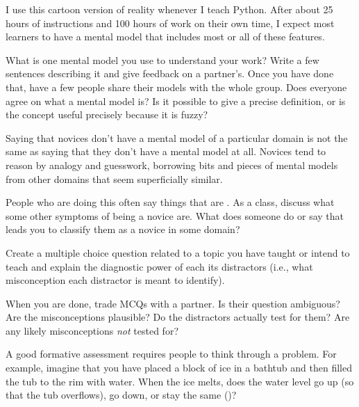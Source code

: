 I use this cartoon version of reality whenever I teach Python.
After about 25 hours of instructions and 100 hours of work on their own time,
I expect most learners to have a mental model
that includes most or all of these features.



What is one mental model you use to understand your work?
Write a few sentences describing it and give feedback on a partner's.
Once you have done that,
have a few people share their models with the whole group.
Does everyone agree on what a mental model is?
Is it possible to give a precise definition,
or is the concept useful precisely because it is fuzzy?


Saying that novices don't have a mental model of a particular domain
is not the same as saying that they don't have a mental model at all.
Novices tend to reason by analogy and guesswork,
borrowing bits and pieces of mental models from other domains that seem superficially similar.

People who are doing this often say things that are
.
As a class,
discuss what some other symptoms of being a novice are.
What does someone do or say that leads you to classify them as a novice in some domain?


Create a multiple choice question related to a topic you have taught
or intend to teach
and explain the diagnostic power of each its distractors
(i.e., what misconception each distractor is meant to identify).

When you are done, trade MCQs with a partner.
Is their question ambiguous?
Are the misconceptions plausible?
Do the distractors actually test for them?
Are any likely misconceptions \emph{not} tested for?


A good formative assessment requires people to think through a problem.
For example,
imagine that you have placed a block of ice in a bathtub and then filled the tub to the rim with water.
When the ice melts,
does the water level go up (so that the tub overflows),
go down,
or stay the same ()?

